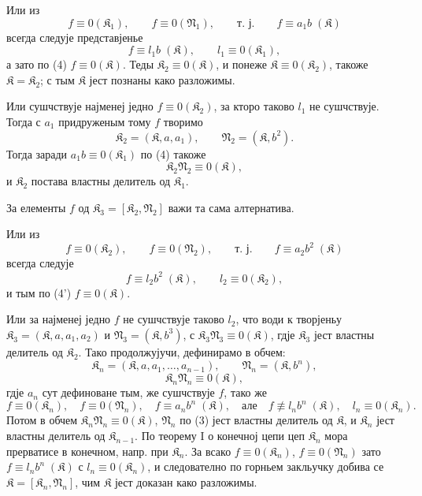 ﻿\documentclass[11pt]{article}
\newcommand{\ideal}[1]{\mathfrak{#1}}
\begin{document}
Или из
\[
 f\equiv0(\ideal K_1),\qquad f\equiv0(\ideal N_1),
 \qquad\text{т. ј.}\qquad f\equiv a_1 b\;(\ideal K)
\]
всегда следује представјенье
\[
 f\equiv l_1 b\;(\ideal K),\qquad l_1\equiv0(\ideal K_1),
\]
а зато по (4) \(f\equiv0(\ideal K)\). Теды \(\ideal K_2\equiv0(\ideal K)\), и понеже \(\ideal K\equiv0(\ideal K_2)\), такоже \(\ideal K=\ideal K_2\); с тым \(\ideal K\) јест познаны како разложимы.

Или сушчствује најменеј једно \(f\equiv0(\ideal K_2)\), за кторо таково \(l_1\) не сушчствује. Тогда с \(a_1\) придруженым тому \(f\) творимо
\[
 \ideal K_2=(\ideal K,a,a_1),\qquad \ideal N_2=(\ideal K,b^2).
\]
Тогда заради \(a_1b\equiv0(\ideal K_1)\) по (4) такоже
\begin{equation}
 \ideal K_2\ideal N_2\equiv0(\ideal K),
\tag{4'}
\end{equation}
и \(\ideal K_2\) постава властны делитель од \(\ideal K_1\).

За елементы \(f\) од \(\ideal K_3=[\ideal K_2,\ideal N_2]\) важи та сама алтернатива.

Или из
\[
 f\equiv0(\ideal K_2),\qquad f\equiv0(\ideal N_2),
 \qquad\text{т. ј.}\qquad f\equiv a_2b^2\;(\ideal K)
\]
всегда следује
\[
 f\equiv l_2b^2\;(\ideal K),\qquad l_2\equiv0(\ideal K_2),
\]
и тым по (4') \(f\equiv0(\ideal K)\).

Или за најменеј једно \(f\) не сушчствује таково \(l_2\), что води к творјеньу \(\ideal K_3=(\ideal K,a,a_1,a_2)\) и \(\ideal N_3=(\ideal K,b^3)\), с \(\ideal K_3\ideal N_3\equiv0(\ideal K)\), гдје \(\ideal K_3\) јест властны делитель од \(\ideal K_2\). Тако продолжујучи, дефинирамо в обчем:
\[
 \ideal K_n=(\ideal K,a,a_1,\ldots,a_{n-1}),\qquad
 \ideal N_n=(\ideal K,b^n),
\]
\[
 \ideal K_n\ideal N_n\equiv0(\ideal K),
\]
гдје \(a_n\) сут дефиноване тым, же сушчствује \(f\), тако же
\[
 f\equiv0(\ideal K_n),\quad f\equiv0(\ideal N_n),\quad
 f\equiv a_n b^n\;(\ideal K),\quad\text{але}\quad
 f\not\equiv l_n b^n\;(\ideal K),\quad l_n\equiv0(\ideal K_n).
\]
Потом в обчем \(\ideal K_n\ideal N_n\equiv0(\ideal K)\), \(\ideal N_n\) по (3) јест властны делитель од \(\ideal K\), и \(\ideal K_n\) јест властны делитель од \(\ideal K_{n-1}\). По теорему I о конечној цепи цеп \(\ideal K_n\) мора прерватисе в конечном, напр. при \(\ideal K_n\). За всако \(f\equiv0(\ideal K_n)\), \(f\equiv0(\ideal N_n)\) зато \(f\equiv l_n b^n\;(\ideal K)\) с \(l_n\equiv0(\ideal K_n)\), и следователно по горньем закльучку добива се \(\ideal K=[\ideal K_n,\ideal N_n]\), чим \(\ideal K\) јест доказан како разложимы.
\end{document}
